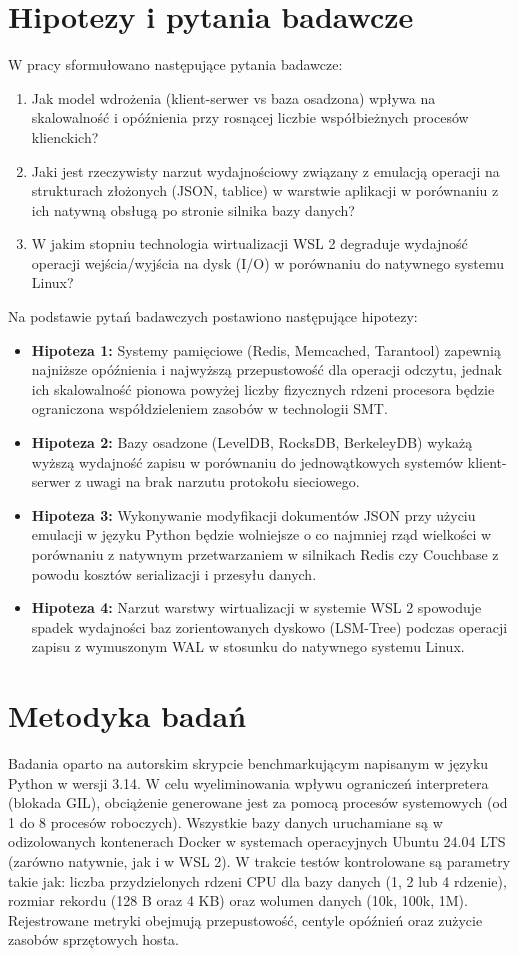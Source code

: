\section{Hipotezy i pytania badawcze}
W pracy sformułowano następujące pytania badawcze:
\begin{enumerate}
    \item Jak model wdrożenia (klient-serwer vs baza osadzona) wpływa na skalowalność i opóźnienia przy rosnącej liczbie współbieżnych procesów klienckich?
    \item Jaki jest rzeczywisty narzut wydajnościowy związany z emulacją operacji na strukturach złożonych (JSON, tablice) w warstwie aplikacji w porównaniu z ich natywną obsługą po stronie silnika bazy danych?
    \item W jakim stopniu technologia wirtualizacji WSL 2 degraduje wydajność operacji wejścia/wyjścia na dysk (I/O) w porównaniu do natywnego systemu Linux?
\end{enumerate}

Na podstawie pytań badawczych postawiono następujące hipotezy:
\begin{itemize}
    \item \textbf{Hipoteza 1:} Systemy pamięciowe (Redis, Memcached, Tarantool) zapewnią najniższe opóźnienia i najwyższą przepustowość dla operacji odczytu, jednak ich skalowalność pionowa powyżej liczby fizycznych rdzeni procesora będzie ograniczona współdzieleniem zasobów w technologii SMT.
    \item \textbf{Hipoteza 2:} Bazy osadzone (LevelDB, RocksDB, BerkeleyDB) wykażą wyższą wydajność zapisu w porównaniu do jednowątkowych systemów klient-serwer z uwagi na brak narzutu protokołu sieciowego.
    \item \textbf{Hipoteza 3:} Wykonywanie modyfikacji dokumentów JSON przy użyciu emulacji w języku Python będzie wolniejsze o co najmniej rząd wielkości w porównaniu z natywnym przetwarzaniem w silnikach Redis czy Couchbase z powodu kosztów serializacji i przesyłu danych.
    \item \textbf{Hipoteza 4:} Narzut warstwy wirtualizacji w systemie WSL 2 spowoduje spadek wydajności baz zorientowanych dyskowo (LSM-Tree) podczas operacji zapisu z wymuszonym WAL w stosunku do natywnego systemu Linux.
\end{itemize}

\section{Metodyka badań}
Badania oparto na autorskim skrypcie benchmarkującym napisanym w języku Python w wersji 3.14. W celu wyeliminowania wpływu ograniczeń interpretera (blokada GIL), obciążenie generowane jest za pomocą procesów systemowych (od 1 do 8 procesów roboczych). Wszystkie bazy danych uruchamiane są w odizolowanych kontenerach Docker w systemach operacyjnych Ubuntu 24.04 LTS (zarówno natywnie, jak i w WSL 2). W trakcie testów kontrolowane są parametry takie jak: liczba przydzielonych rdzeni CPU dla bazy danych (1, 2 lub 4 rdzenie), rozmiar rekordu (128 B oraz 4 KB) oraz wolumen danych (10k, 100k, 1M). Rejestrowane metryki obejmują przepustowość, centyle opóźnień oraz zużycie zasobów sprzętowych hosta.

